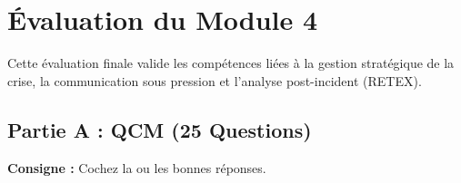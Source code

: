 \chapter{Évaluation du Module 4}
\label{chap:evalmod4}

Cette évaluation finale valide les compétences liées à la gestion stratégique de la crise, la communication sous pression et l'analyse post-incident (RETEX).

\section{Partie A : QCM (25 Questions)}

\textbf{Consigne :} Cochez la ou les bonnes réponses.

